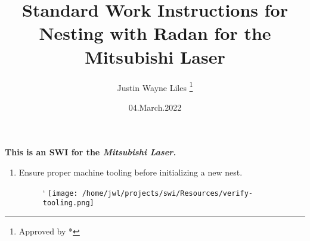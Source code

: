\documentclass[11pt, a4paper, oneside]{report}
\title{Standard Work Instructions for Nesting with Radan for the Mitsubishi Laser}
\author{Justin Wayne Liles \thanks{Approved by *}}
\date{04.March.2022}
\begin{document}
\renewcommand{\labelenumii}{\arabic{enumi}.\arabic{enumii}}
\renewcommand{\labelenumiii}{\arabic{enumi}.\arabic{enumii}.\arabic{enumiii}}
\renewcommand{\labelenumiv}{\arabic{enumi}.\arabic{enumii}.\arabic{enumiii}.\arabic{enumiv}}
\begin{titlepage}
    \maketitle
\end{titlepage}
\textbf{This is an SWI for the \emph{Mitsubishi Laser.}}
\begin{enumerate}
    \item Ensure proper machine tooling before initializing a new nest.
        \begin{figure}[!h]
            \centering`
            \texttt{[image: /home/jwl/projects/swi/Resources/verify-tooling.png]}


\end{figure}
\end{enumerate}
\end{document}
